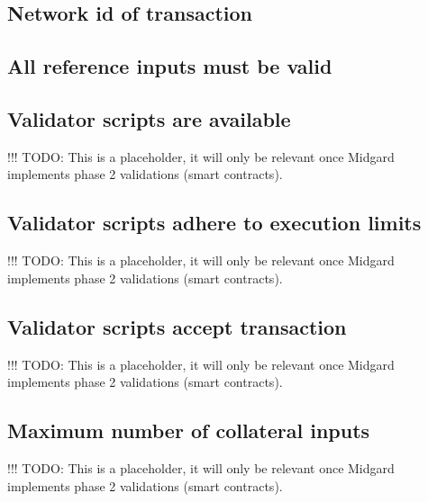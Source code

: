 \documentclass[../midgard.tex]{subfiles}
\begin{document}
\subsection{Network id of transaction}

\subsection{All reference inputs must be valid}


\subsection{Validator scripts are available}

!!! TODO: This is a placeholder, it will only be relevant once Midgard implements phase 2 validations (smart contracts).

\subsection{Validator scripts adhere to execution limits}

!!! TODO: This is a placeholder, it will only be relevant once Midgard implements phase 2 validations (smart contracts).

\subsection{Validator scripts accept transaction}

!!! TODO: This is a placeholder, it will only be relevant once Midgard implements phase 2 validations (smart contracts).

\subsection{Maximum number of collateral inputs}

!!! TODO: This is a placeholder, it will only be relevant once Midgard implements phase 2 validations (smart contracts).
\end{document}
